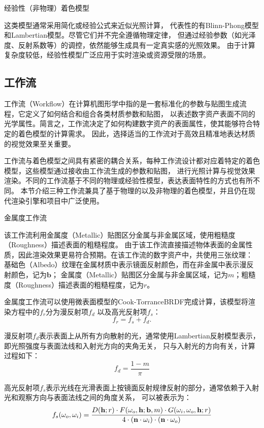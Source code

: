 经验性（非物理）着色模型

这类模型通常采用简化或经验公式来近似光照计算，
代表性的有Blinn-Phong模型和Lambertian模型。尽管它们并不完全遵循物理定律，
但通过经验参数（如光泽度、反射系数等）的调控，依然能够生成具有一定真实感的光照效果。
由于计算复杂度较低，经验性模型广泛应用于实时渲染或资源受限的场景。

\subsection{工作流}
工作流（Workflow）在计算机图形学中指的是一套标准化的参数与贴图生成流程，它定义了如何结合和组合各类材质参数和贴图，
以表述数字资产表面不同的光学属性。简言之，工作流决定了如何构建数字资产的表面属性，使其能够符合特定的着色模型的计算需求。
因此，选择适当的工作流对于高效且精准地表达材质的视觉效果至关重要。

工作流与着色模型之间具有紧密的耦合关系，每种工作流设计都对应着特定的着色模型，这些模型通过接收由工作流生成的参数和贴图，
进行光照计算与视觉效果渲染。不同的工作流基于不同的物理或经验性模型，表达表面特性的方式也有所不同。
本节介绍三种工作流兼具了基于物理的以及非物理的着色模型，并且仍在现代渲染引擎和项目中广泛使用。

金属度工作流

该工作流利用金属度（Metallic）贴图区分金属与非金属区域，使用粗糙度（Roughness）描述表面的粗糙程度。
由于该工作流直接描述物体表面的金属性质，因此渲染效果更易符合预期。在该工作流的数字资产中，共使用三张纹理：
基础色（Albedo）纹理在金属材质中表示镜面反射颜色，而在非金属中表示漫反射颜色，记为$\mathbf{b}$；
金属度（Metallic）贴图区分金属与非金属区域，记为$m$；粗糙度（Roughness）描述表面的粗糙程度，记为$r$。

金属度工作流可以使用微表面模型的Cook-TorranceBRDF完成计算，该模型将渲染方程中的$f_r$分为漫反射项$f_d$
以及高光反射项$f_s$：
\begin{equation}\label{eq:cook-torrance}
f_r=f_s+f_d.
\end{equation}

漫反射项$f_d$表示表面上从所有方向散射的光，通常使用Lambertian反射模型表示，即光照强度与表面法线和入射光方向的夹角无关，
只与入射光的方向有关，计算过程如下：
\begin{equation}\label{eq:lambertian}
f_d=\frac{1-m}{\pi}
\end{equation}

高光反射项$f_s$表示光线在光滑表面上按镜面反射规律反射的部分，通常依赖于入射光和观察方向与表面法线之间的角度关系，
可以被表示为：
\begin{equation}\label{eq:specular}
f_s(\omega_o,\omega_i)=\frac{D({\bf{h}};r)\cdot F(\omega_o,{\bf{h}};{\bf{b}},m)\cdot G(\omega_i,\omega_o,{\bf{h}};r)}
{4\cdot({\bf{n}}\cdot\omega_i)\cdot({\bf{n}}\cdot\omega_o)}
\end{equation}


